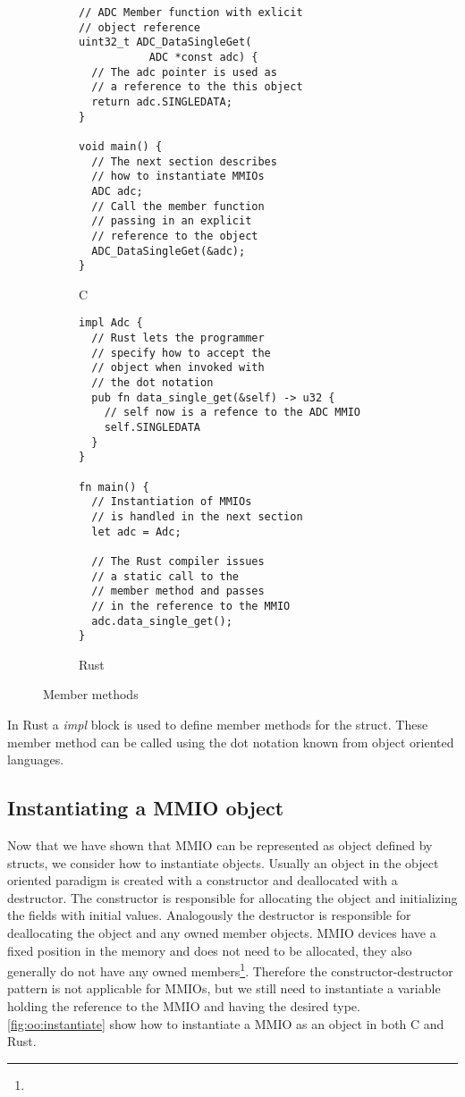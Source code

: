 \begin{figure}[H]
  \centering

  \begin{subfigure}{0.47\textwidth}
      \begin{verbatim}
// ADC Member function with exlicit
// object reference
uint32_t ADC_DataSingleGet(
           ADC *const adc) {
  // The adc pointer is used as
  // a reference to the this object
  return adc.SINGLEDATA;
}

void main() {
  // The next section describes
  // how to instantiate MMIOs
  ADC adc;
  // Call the member function
  // passing in an explicit
  // reference to the object
  ADC_DataSingleGet(&adc);
}
      \end{verbatim}
      \caption{C}
      \label{lst:back:oo:c}
  \end{subfigure}
  \hfill
  \begin{subfigure}{0.47\textwidth}
      \begin{verbatim}
impl Adc {
  // Rust lets the programmer
  // specify how to accept the
  // object when invoked with
  // the dot notation
  pub fn data_single_get(&self) -> u32 {
    // self now is a refence to the ADC MMIO
    self.SINGLEDATA
  }
}

fn main() {
  // Instantiation of MMIOs
  // is handled in the next section
  let adc = Adc;

  // The Rust compiler issues
  // a static call to the
  // member method and passes
  // in the reference to the MMIO
  adc.data_single_get();
}
      \end{verbatim}
      \caption{Rust}
  \end{subfigure}
  \caption{Member methods}
  \label{fig:back:memlayout}

\end{figure}
In Rust a \emph{impl} block is used to define member methods for the struct.
These member method can be called using the dot notation known from object oriented languages.

\subsection{Instantiating a MMIO object}

Now that we have shown that MMIO can be represented as object defined by structs, we consider how to instantiate objects.
Usually an object in the object oriented paradigm is created with a constructor and deallocated with a destructor.
The constructor is responsible for allocating the object and initializing the fields with initial values.
Analogously the destructor is responsible for deallocating the object and any owned member objects.
MMIO devices have a fixed position in the memory and does not need to be allocated, they also generally do not have any owned members\footnote{}.
Therefore the constructor-destructor pattern is not applicable for MMIOs, but we still need to instantiate a variable holding the reference to the MMIO and having the desired type.
\autoref{fig:oo:instantiate} show how to instantiate a MMIO as an object in both C and Rust.


